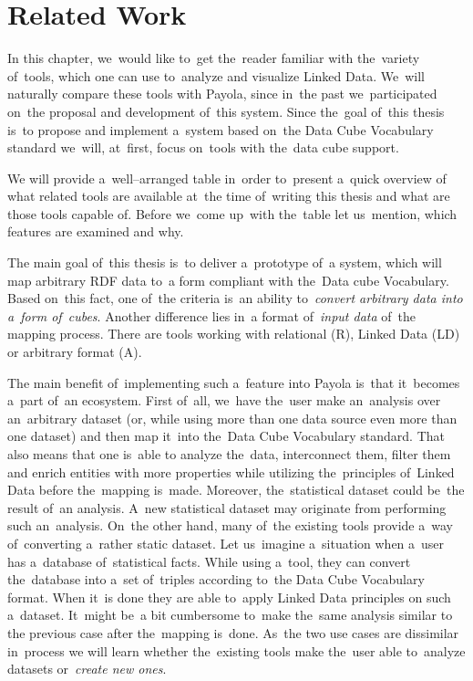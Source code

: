 \chapter{Related Work}
\label{chap:rw}

In this chapter, we~would like to~get the~reader familiar with the~variety of~tools, which one can
use to~analyze and visualize Linked Data. We~will naturally compare these tools with
Payola, since in~the past we~participated on~the proposal and development of~this system.
Since the~goal of~this thesis is~to propose and implement a~system based on~the Data Cube Vocabulary
standard we~will, at~first, focus on~tools with the~data cube support. 

We will provide a~well--arranged table in~order to~present a~quick overview of
what related tools are available at~the time of~writing this thesis and what are those 
tools capable of. Before we~come up~with the~table let us~mention, which
features are examined and why.

The main goal of~this thesis is~to deliver a~prototype of~a system, which will map 
arbitrary RDF data to~a form compliant with the~Data cube Vocabulary. Based on~this fact, one of~the criteria is~an ability to~\emph{convert arbitrary data 
into a~form of~cubes}. Another difference lies in~a format of~\emph{input data} of~the
mapping process. There are tools working with relational (R), Linked Data (LD) or
arbitrary format (A).

The main benefit of~implementing such a~feature into Payola is~that it~becomes a~part of~an ecosystem. First of~all, we~have the~user make an~analysis over an~arbitrary
dataset (or, while using more than one data source even more than one dataset)
and then map it~into the~Data Cube Vocabulary standard. That also means that one is~able
to analyze the~data, interconnect them, filter them and enrich entities with more properties
while utilizing the~principles of~Linked Data before the~mapping is~made. Moreover, the~statistical
dataset could be~the result of~an analysis. A~new statistical dataset may originate from performing
such an~analysis. On~the other hand, many of~the existing 
tools provide a~way of~converting a~rather static dataset. Let us~imagine a~situation when a~user has a~database of~statistical facts. While using a~tool, they can 
convert the~database into a~set of~triples according to~the Data Cube 
Vocabulary format. When it~is done they are able to~apply Linked Data principles
on such a~dataset. It~might be~a bit cumbersome to~make the~same analysis similar to
the previous case after the~mapping is~done. As~the two use cases are dissimilar in~process 
we will learn whether the~existing tools make the~user able to~analyze datasets or~\emph{create new ones}.

